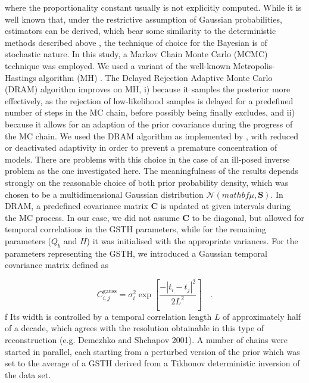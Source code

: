 \documentclass[cp]{copernicus}
\begin{document}
where the proportionality constant usually is not explicitly computed. While it is well known that, 
under the restrictive assumption of Gaussian probabilities, estimators can be derived, which bear 
some similarity to the deterministic methods described above \citep{Tarantola1982a,Tarantola1982b}, 
the technique of choice for the Bayesian is of stochastic nature. In this study, a Markov Chain 
Monte Carlo (MCMC) technique was employed. We used a variant of the well-known Metropolis-Hastings 
algorithm (MH) \citep{Metropolis1953a, Hastings1970a,Haario2006a}. The Delayed Rejection Adaptive 
Monte Carlo (DRAM) algorithm improves on MH, i) because it samples the posterior more effectively, 
as the rejection of low-likelihood samples is delayed for a predefined number of steps in the MC 
chain, before possibly being finally excludes, and ii) because it allows for an adaption of the 
prior covariance during the progress of the MC chain. We used the DRAM algorithm as implemented by 
\citet{Haario2006a}, with reduced or deactivated adaptivity in order to prevent a premature 
concentration of models. There are problems with this choice in the case of an ill-posed inverse 
problem as the one investigated here. The meaningfulness of the results depends strongly on the 
reasonable choice of both prior probability density, which was chosen to be a multidimensional 
Gaussian distribution $\mathcal{N}(mathbf{\mu},\mathbf{S})$. In DRAM, a predefined covariance matrix 
$\mathbf{C}$ is updated at given intervals during the MC process. In our case, we did not 
assume $\mathbf{C}$ to be diagonal, but allowed for temporal correlations in the GSTH parameters, 
while for the remaining parameters ($Q_b$ and $H$) it was initialised with the appropriate 
variances. For the parameters representing the GSTH, we introduced a Gaussian temporal covariance 
matrix defined as

\begin{equation}\label{eqn:13}
C_{i,j}^{{\text{gauss}}} = \sigma _i^2\exp \left[ {\frac{{ - {{\left| {{t_i} - 
{t_j}} \right|}^2}}}{{2{L^2}}}} \right] \quad .
\end{equation} 
 	f
Its width is controlled by a temporal correlation length $L$  of approximately 
half of a decade, which agrees with the resolution obtainable in this type of reconstruction (e.g. 
Demezhko and Shchapov 2001). A number of chains were started in parallel, each starting from a 
perturbed version of the prior which was set to the average of a GSTH derived from a Tikhonov 
deterministic inversion of the data set.
\end{document}
